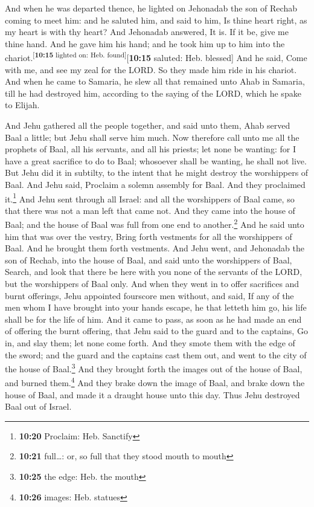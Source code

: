  And when he was departed thence, he lighted on Jehonadab
the son of Rechab coming to meet him: and he saluted him, and said to
him, Is thine heart right, as my heart is with thy heart? And Jehonadab
answered, It is. If it be, give me thine hand. And he gave him his hand;
and he took him up to him into the
chariot.\textsuperscript{{[}\textbf{10:15} lighted on: Heb.
found{]}}{[}\textbf{10:15} saluted: Heb. blessed{]}  And
he said, Come with me, and see my zeal for the LORD. So they made him
ride in his chariot.  And when he came to Samaria, he
slew all that remained unto Ahab in Samaria, till he had destroyed him,
according to the saying of the LORD, which he spake to Elijah.

 And Jehu gathered all the people together, and said unto
them, Ahab served Baal a little; but Jehu shall serve him much.
 Now therefore call unto me all the prophets of Baal, all
his servants, and all his priests; let none be wanting: for I have a
great sacrifice to do to Baal; whosoever shall be wanting, he shall not
live. But Jehu did it in subtilty, to the intent that he might destroy
the worshippers of Baal.  And Jehu said, Proclaim a
solemn assembly for Baal. And they proclaimed it.\footnote{\textbf{10:20}
  Proclaim: Heb. Sanctify}  And Jehu sent through all
Israel: and all the worshippers of Baal came, so that there was not a
man left that came not. And they came into the house of Baal; and the
house of Baal was full from one end to another.\footnote{\textbf{10:21}
  full\ldots: or, so full that they stood mouth to mouth}
 And he said unto him that was over the vestry, Bring
forth vestments for all the worshippers of Baal. And he brought them
forth vestments.  And Jehu went, and Jehonadab the son of
Rechab, into the house of Baal, and said unto the worshippers of Baal,
Search, and look that there be here with you none of the servants of the
LORD, but the worshippers of Baal only.  And when they
went in to offer sacrifices and burnt offerings, Jehu appointed
fourscore men without, and said, If any of the men whom I have brought
into your hands escape, he that letteth him go, his life shall be for
the life of him.  And it came to pass, as soon as he had
made an end of offering the burnt offering, that Jehu said to the guard
and to the captains, Go in, and slay them; let none come forth. And they
smote them with the edge of the sword; and the guard and the captains
cast them out, and went to the city of the house of Baal.\footnote{\textbf{10:25}
  the edge: Heb. the mouth}  And they brought forth the
images out of the house of Baal, and burned them.\footnote{\textbf{10:26}
  images: Heb. statues}  And they brake down the image of
Baal, and brake down the house of Baal, and made it a draught house unto
this day.  Thus Jehu destroyed Baal out of Israel.


